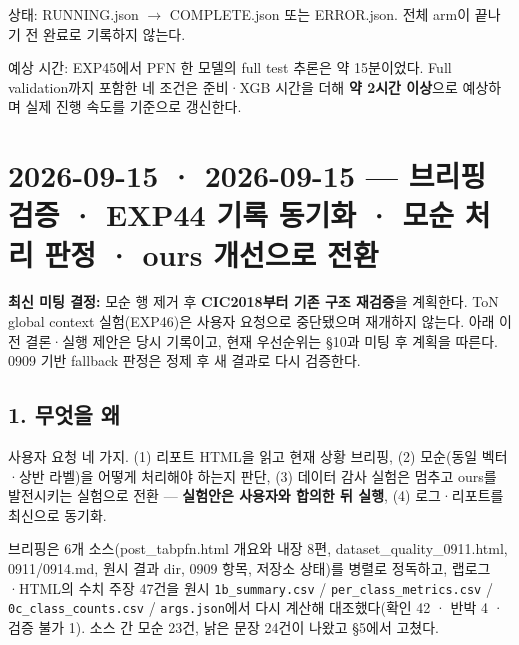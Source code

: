 \par\noindent \textbullet\enspace 상태: RUNNING.json  \ensuremath{\rightarrow}  COMPLETE.json 또는 ERROR.json. 전체 arm이 끝나기 전 완료로 기록하지 않는다.


예상 시간: EXP45에서 PFN 한 모델의 full test 추론은 약 15분이었다. Full validation까지 포함한 네 조건은 준비·XGB 시간을 더해 \textbf{약 2시간 이상}으로 예상하며 실제 진행 속도를 기준으로 갱신한다.



\section{2026-09-15 · 2026-09-15 — 브리핑 검증 · EXP44 기록 동기화 · 모순 처리 판정 · ours 개선으로 전환}
\label{report:20260915_0915}
\textbf{최신 미팅 결정:} 모순 행 제거 후 \textbf{CIC2018부터 기존 구조 재검증}을 계획한다. ToN global context 실험(EXP46)은 사용자 요청으로 중단됐으며 재개하지 않는다. 아래 이전 결론·실행 제안은 당시 기록이고, 현재 우선순위는 §10과 미팅 후 계획을 따른다. 0909 기반 fallback 판정은 정제 후 새 결과로 다시 검증한다.



\subsection{1. 무엇을 왜}
사용자 요청 네 가지. (1) 리포트 HTML을 읽고 현재 상황 브리핑, (2) 모순(동일 벡터·상반 라벨)을 어떻게 처리해야 하는지 판단, (3) 데이터 감사 실험은 멈추고 ours를 발전시키는 실험으로 전환 — \textbf{실험안은 사용자와 합의한 뒤 실행}, (4) 로그·리포트를 최신으로 동기화.

브리핑은 6개 소스(post\_\allowbreak{}tabpfn.html 개요와 내장 8편, dataset\_\allowbreak{}quality\_\allowbreak{}0911.html, 0911/\allowbreak{}0914.md, 원시 결과 dir, 0909 항목, 저장소 상태)를 병렬로 정독하고, 랩로그·HTML의 수치 주장 47건을 원시 \texttt{1b\_\allowbreak{}\allowbreak{}summa\allowbreak{}ry.\allowbreak{}csv} /\allowbreak{} \texttt{per\_\allowbreak{}\allowbreak{}clas\allowbreak{}s\_\allowbreak{}\allowbreak{}metric\allowbreak{}s.\allowbreak{}csv} /\allowbreak{} \texttt{0c\_\allowbreak{}\allowbreak{}class\allowbreak{}\_\allowbreak{}\allowbreak{}counts.\allowbreak{}csv} /\allowbreak{} \texttt{args.\allowbreak{}jso\allowbreak{}n}에서 다시 계산해 대조했다(확인 42 · 반박 4 · 검증 불가 1). 소스 간 모순 23건, 낡은 문장 24건이 나왔고 §5에서 고쳤다.

